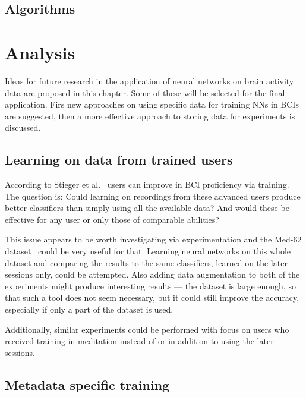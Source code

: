 \documentclass[eng,BP]{thesiskiv}
\begin{document}

\section{Algorithms}


\chapter{Analysis}

Ideas for future research in the application of neural networks on brain activity data are proposed in this chapter. Some of these will be selected for the final application. Firs new approaches on using specific data for training NNs in BCIs are suggested, then a more effective approach to storing data for experiments is discussed.

\section{Learning on data from trained users}

According to Stieger et al.~\cite{stieger:data:21,stieger:mindfulness:20} users can improve in BCI proficiency via training. The question is: Could learning on recordings from these advanced users produce better classifiers than simply using all the available data? And would these be effective for any user or only those of comparable abilities?

This issue appears to be worth investigating via experimentation and the Med-62 dataset~\cite{stieger:data:21} could be very useful for that. Learning neural networks on this whole dataset and comparing the results to the same classifiers, learned on the later sessions only, could be  attempted. Also adding data augmentation to both of the experiments might produce interesting results --- the dataset is large enough, so that such a tool does not seem necessary, but it could still improve the accuracy, especially if only a part of the dataset is used.

Additionally, similar experiments could be performed with focus on users who received training in meditation instead of or in addition to using the later sessions.

\section{Metadata specific training}
\end{document}
